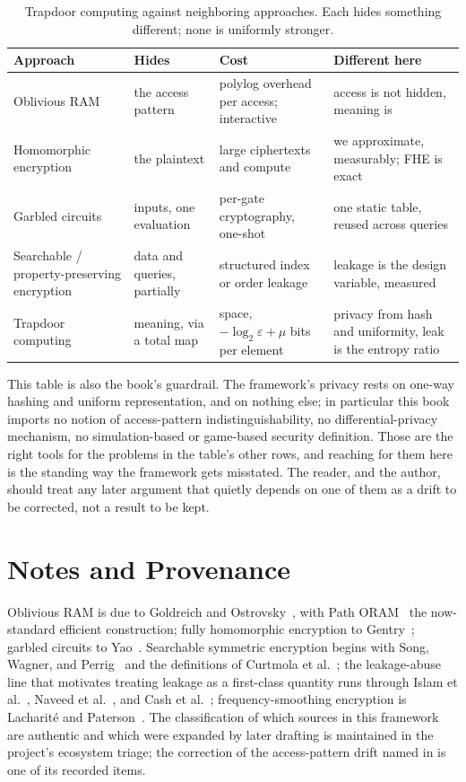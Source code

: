 \begin{table}[t]
\centering
\caption{Trapdoor computing against neighboring approaches. Each hides
something different; none is uniformly stronger.}
\label{tab:not}
\begin{tabular}{@{}p{2.4cm}p{2.8cm}p{3.0cm}p{3.4cm}@{}}
\toprule
Approach & Hides & Cost & Different here \\
\midrule
Oblivious RAM & the access pattern & polylog overhead per access; interactive & access is not hidden, meaning is \\
Homomorphic encryption & the plaintext & large ciphertexts and compute & we approximate, measurably; FHE is exact \\
Garbled circuits & inputs, one evaluation & per-gate cryptography, one-shot & one static table, reused across queries \\
Searchable / property-preserving encryption & data and queries, partially & structured index or order leakage & leakage is the design variable, measured \\
\midrule
Trapdoor computing & meaning, via a total map & space, $-\log_2 \varepsilon + \mu$ bits per element & privacy from hash and uniformity, leak is the entropy ratio \\
\bottomrule
\end{tabular}
\end{table}

This table is also the book's guardrail. The framework's privacy rests on
one-way hashing and uniform representation, and on nothing else; in
particular this book imports no notion of access-pattern
indistinguishability, no differential-privacy mechanism, no
simulation-based or game-based security definition. Those are the right
tools for the problems in the table's other rows, and reaching for them
here is the standing way the framework gets misstated. The reader, and the
author, should treat any later argument that quietly depends on one of them
as a drift to be corrected, not a result to be kept.

\section{Notes and Provenance}
\label{sec:ch2-notes}

Oblivious RAM is due to Goldreich and Ostrovsky~\cite{goldreich1996software},
with Path ORAM~\cite{stefanov2013path} the now-standard efficient
construction; fully homomorphic encryption to Gentry~\cite{gentry2009fully};
garbled circuits to Yao~\cite{yao1986generate}. Searchable symmetric
encryption begins with Song, Wagner, and Perrig~\cite{song2000practical} and
the definitions of Curtmola et
al.~\cite{curtmola2006searchable}; the leakage-abuse line that motivates
treating leakage as a first-class quantity runs through Islam et
al.~\cite{islam2012access}, Naveed et al.~\cite{naveed2015inference}, and
Cash et al.~\cite{cash2015leakage}; frequency-smoothing encryption is
Lacharit\'e and Paterson~\cite{lacharite2018frequency}. The classification
of which sources in this framework are authentic and which were expanded by
later drafting is maintained in the project's ecosystem triage; the
correction of the access-pattern drift named in
 is one of its recorded items.
